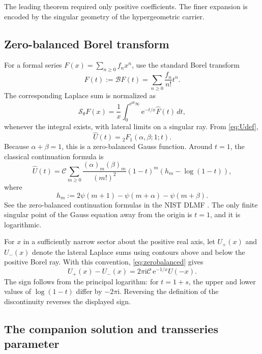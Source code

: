 \documentclass[11pt,a4paper]{article}
\theoremstyle{definition}
\theoremstyle{remark}
\newcommand{\ii}{\mathrm{i}}
\newcommand{\e}{\mathrm{e}}
\newcommand{\Borel}{\mathcal{B}}
\newcommand{\constC}{\mathcal{C}}
\begin{document}
The leading theorem required only positive coefficients.  The finer expansion is encoded by the singular geometry of the hypergeometric carrier.

\subsection{Zero-balanced Borel transform}

For a formal series \(F(x)=\sum_{n\ge0}f_nx^n\), use the standard Borel transform
\begin{equation}\label{eq:Borel}
 \widehat F(t):=\Borel F(t)=\sum_{n\ge0}\frac{f_n}{n!}t^n.
\end{equation}
The corresponding Laplace sum is normalized as
\[
 \mathcal S_\theta F(x)=\frac1x\int_0^{\e^{\ii\theta}\infty}
 \e^{-t/x}\widehat F(t)\,dt,
\]
whenever the integral exists, with lateral limits on a singular ray.
From \eqref{eq:Udef},
\begin{equation}\label{eq:Uhat}
 \widehat U(t)={}_2F_1(\alpha,\beta;1;t).
\end{equation}
Because \(\alpha+\beta=1\), this is a zero-balanced Gauss function.  Around \(t=1\), the classical continuation formula is
\begin{equation}\label{eq:zerobalanced}
 \widehat U(t)=\constC\sum_{m\ge0}
 \frac{(\alpha)_m(\beta)_m}{(m!)^2}(1-t)^m
 \left(h_m-\log(1-t)\right),
\end{equation}
where
\begin{equation}\label{eq:hm}
 h_m:=2\psi(m+1)-\psi(m+\alpha)-\psi(m+\beta).
\end{equation}
See the zero-balanced continuation formulas in the NIST DLMF \cite{DLMFHypergeometric}.  The only finite singular point of the Gauss equation away from the origin is \(t=1\), and it is logarithmic.

For \(x\) in a sufficiently narrow sector about the positive real axis, let \(U_+(x)\) and \(U_-(x)\) denote the lateral Laplace sums using contours above and below the positive Borel ray.  With this convention, \eqref{eq:zerobalanced} gives
\begin{equation}\label{eq:Ujump}
 U_+(x)-U_-(x)
 =2\pi\ii\constC\,\e^{-1/x}U(-x).
\end{equation}
The sign follows from the principal logarithm: for \(t=1+s\), the upper and lower values of \(\log(1-t)\) differ by \(-2\pi\ii\).  Reversing the definition of the discontinuity reverses the displayed sign.

\subsection{The companion solution and transseries parameter}
\end{document}
